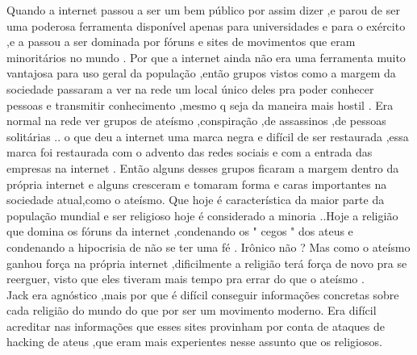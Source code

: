 \documentclass{book}
\begin{document}
Quando a internet passou a ser um bem público por assim dizer ,e parou de ser uma poderosa ferramenta disponível apenas para universidades e para o exército ,e a passou a ser dominada por fóruns e sites de movimentos que eram minoritários no mundo . Por que a internet ainda não era uma ferramenta muito vantajosa para uso geral da população ,então grupos vistos como a margem da sociedade passaram a ver na rede um local único deles pra poder conhecer pessoas e transmitir conhecimento ,mesmo q seja da maneira mais hostil . Era normal na rede ver grupos de ateísmo ,conspiração ,de assassinos ,de pessoas solitárias .. o que deu a internet uma marca negra e difícil de ser restaurada ,essa marca foi restaurada com o advento das redes sociais e com a entrada das empresas na internet . Então alguns desses grupos ficaram a margem dentro da própria internet e alguns cresceram e tomaram forma e caras importantes na sociedade atual,como o ateísmo.  Que hoje é característica da maior parte da população mundial e ser religioso hoje é considerado a minoria ..Hoje a religião que domina os fóruns da internet ,condenando os " cegos " dos ateus e condenando a hipocrisia de não se ter uma fé . Irônico não ? Mas como o ateísmo ganhou força na própria internet ,dificilmente a religião terá força de novo pra se reerguer, visto que eles tiveram mais tempo pra errar do que o ateísmo .\\
Jack era agnóstico ,mais por que é difícil conseguir informações concretas sobre cada religião do mundo do que por ser  um movimento moderno. Era difícil acreditar nas informações que esses sites provinham por conta de ataques de hacking de ateus ,que eram mais experientes nesse assunto que os religiosos. \\
\end{document}
